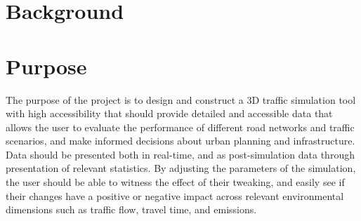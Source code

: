 


\section{Background}


\section{Purpose}
    The purpose of the project is to design and construct a 3D traffic simulation tool with high accessibility that should provide detailed and accessible data that allows the user to evaluate the performance of different road networks and traffic scenarios, and make informed decisions about urban planning and infrastructure. Data should be presented both in real-time, and as post-simulation data through presentation of relevant statistics. By adjusting the parameters of the simulation, the user should be able to witness the effect of their tweaking, and easily see if their changes have a positive or negative impact across relevant environmental dimensions such as traffic flow, travel time, and emissions. 

